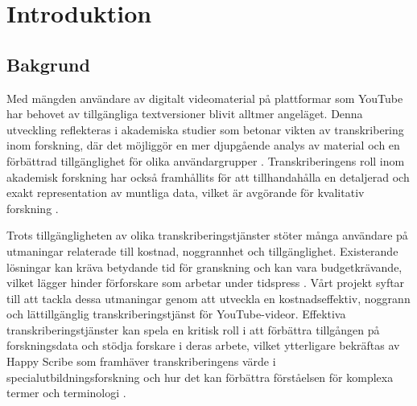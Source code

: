 \chapter{Introduktion}

\section{Bakgrund}
Med mängden användare av digitalt videomaterial på plattformar som YouTube har
behovet av tillgängliga textversioner blivit alltmer angeläget. Denna
utveckling reflekteras i akademiska studier som betonar vikten av
transkribering inom forskning, där det möjliggör en mer djupgående analys av
material och en förbättrad tillgänglighet för olika användargrupper
\cite{RevBlog2019}. Transkriberingens roll inom akademisk forskning har också
framhållits för att tillhandahålla en detaljerad och exakt representation av
muntliga data, vilket är avgörande för kvalitativ forskning
\cite{OxfordAcademicND}.

Trots tillgängligheten av olika transkriberingstjänster stöter många användare
på utmaningar relaterade till kostnad, noggrannhet och tillgänglighet.
Existerande lösningar kan kräva betydande tid för granskning och kan vara
budgetkrävande, vilket lägger hinder förforskare som arbetar under tidspress
\cite{RevBlog2019}. Vårt projekt syftar till att tackla dessa utmaningar genom
att utveckla en kostnadseffektiv, noggrann och lättillgänglig
transkriberingstjänst för YouTube-videor. Effektiva transkriberingstjänster
kan spela en kritisk roll i att förbättra tillgången på forskningsdata och
stödja forskare i deras arbete, vilket ytterligare bekräftas av Happy Scribe
som framhäver transkriberingens värde i specialutbildningsforskning och hur
det kan förbättra förståelsen för komplexa termer och terminologi
\cite{HappyScribeND}.

